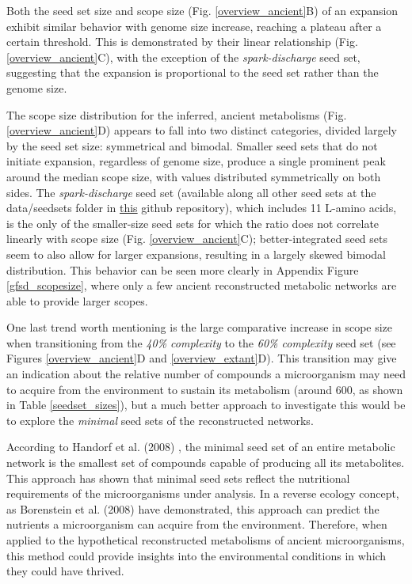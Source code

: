 Both the seed set size and scope size (Fig. \ref{overview_ancient}B) of an expansion exhibit similar behavior with genome size increase, reaching a plateau after a certain threshold. This is demonstrated by their linear relationship (Fig. \ref{overview_ancient}C), with the exception of the \textit{spark-discharge} seed set, suggesting that the expansion is proportional to the seed set rather than the genome size.

The scope size distribution for the inferred, ancient metabolisms (Fig. \ref{overview_ancient}D) appears to fall into two distinct categories, divided largely by the seed set size: symmetrical and bimodal. Smaller seed sets that do not initiate expansion, regardless of genome size, produce a single prominent peak around the median scope size, with values distributed symmetrically on both sides. The \textit{spark-discharge} seed set (available along all other seed sets at the data/seedsets folder in \href{https://github.com/astrademertzi/metnetexp_report}{this} github repository), which includes 11 L-amino acids, is the only of the smaller-size seed sets for which the ratio does not correlate linearly with scope size (Fig. \ref{overview_ancient}C); better-integrated seed sets seem to also allow for larger expansions, resulting in a largely skewed bimodal distribution. This behavior can be seen more clearly in Appendix Figure \ref{gfsd_scopesize}, where only a few ancient reconstructed metabolic networks are able to provide larger scopes. %

One last trend worth mentioning is the large comparative increase in scope size when transitioning from the \textit{40\% complexity} to the \textit{60\% complexity} seed set (see Figures \ref{overview_ancient}D and \ref{overview_extant}D). This transition may give an indication about the relative number of compounds a microorganism may need to acquire from the environment to sustain its metabolism (around 600, as shown in Table \ref{seedset_sizes}), but a much better approach to investigate this would be to explore the \textit{minimal} seed sets of the reconstructed networks.


According to Handorf et al. (2008) \cite{handorf2008}, the minimal seed set of an entire metabolic network is the smallest set of compounds capable of producing all its metabolites. This approach has shown that minimal seed sets reflect the nutritional requirements of the microorganisms under analysis. In a reverse ecology concept, as Borenstein et al. (2008) \cite{borenstein2008} have demonstrated, this approach can predict the nutrients a microorganism can acquire from the environment. Therefore, when applied to the hypothetical reconstructed metabolisms of ancient microorganisms, this method could provide insights into the environmental conditions in which they could have thrived.

